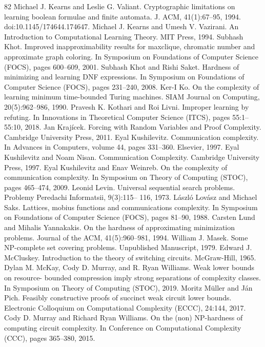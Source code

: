 \documentclass[10pt,a4paper]{article}
\begin{document}
\begin{thebibliography}{82}
Michael J. Kearns and Leslie G. Valiant. Cryptographic limitations on learning boolean formulae and finite automata. J. ACM, 41(1):67–95, 1994. doi:10.1145/174644.174647.
Michael J. Kearns and Umesh V. Vazirani. An Introduction to Computational Learning Theory. MIT Press, 1994.
Subhash Khot. Improved inapproximability results for maxclique, chromatic number and approximate graph coloring. In Symposium on Foundations of Computer Science (FOCS), pages 600–609, 2001.
Subhash Khot and Rishi Saket. Hardness of minimizing and learning DNF expressions. In Symposium on Foundations of Computer Science (FOCS), pages 231–240, 2008.
Ker-I Ko. On the complexity of learning minimum time-bounded Turing machines. SIAM Journal on Computing, 20(5):962–986, 1990.
Pravesh K. Kothari and Roi Livni. Improper learning by refuting. In Innovations in Theoretical Computer Science (ITCS), pages 55:1–55:10, 2018.
Jan Krajícek. Forcing with Random Variables and Proof Complexity. Cambridge University Press, 2011.
Eyal Kushilevitz. Communication complexity. In Advances in Computers, volume 44, pages 331–360. Elsevier, 1997.
Eyal Kushilevitz and Noam Nisan. Communication Complexity. Cambridge University Press, 1997.
Eyal Kushilevitz and Enav Weinreb. On the complexity of communication complexity. In Symposium on Theory of Computing (STOC), pages 465–474, 2009.
Leonid Levin. Universal sequential search problems. Problemy Peredachi Informatsii, 9(3):115– 116, 1973.
László Lovász and Michael Saks. Lattices, mobius functions and communications complexity. In Symposium on Foundations of Computer Science (FOCS), pages 81–90, 1988.
Carsten Lund and Mihalis Yannakakis. On the hardness of approximating minimization problems. Journal of the ACM, 41(5):960–981, 1994.
William J. Masek. Some NP-complete set covering problems. Unpublished Manuscript, 1979.
Edward J. McCluskey. Introduction to the theory of switching circuits. McGraw-Hill, 1965.
Dylan M. McKay, Cody D. Murray, and R. Ryan Williams. Weak lower bounds on resource- bounded compression imply strong separations of complexity classes. In Symposium on Theory of Computing (STOC), 2019.
Moritz Müller and Ján Pich. Feasibly constructive proofs of succinct weak circuit lower bounds. Electronic Colloquium on Computational Complexity (ECCC), 24:144, 2017.
Cody D. Murray and Richard Ryan Williams. On the (non) NP-hardness of computing circuit complexity. In Conference on Computational Complexity (CCC), pages 365–380, 2015.

\end{thebibliography}
\end{document}
